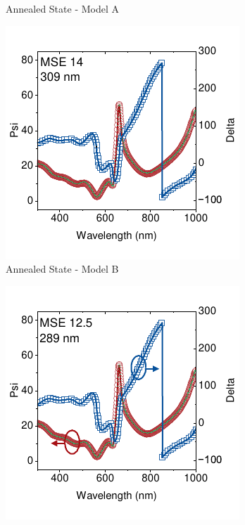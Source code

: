 \begin{figure}[t]
\begin{subfigure}[t]{0.45\textwidth}
        \caption{Annealed State - Model A}
        \label{fig:ellipsometry:static_fits:t23_fixed_thick_50_void}
    \end{subfigure} 
    \begin{subfigure}[t]{0.45\textwidth}
        \centering
        \includegraphics[width=\textwidth]{chapters/ellipsometry/image/t23_fitted_thickness.pdf} %
        \caption{Annealed State - Model B}
        \label{fig:ellipsometry:static_fits:t23_fitted_thick}
    \end{subfigure}
    \hfill
    \begin{subfigure}[t]{0.45\textwidth}
        \centering
        \includegraphics[width=\textwidth]{chapters/ellipsometry/image/t23_fixed_thick_x_void_p.pdf} %

\end{subfigure}
\end{figure}
